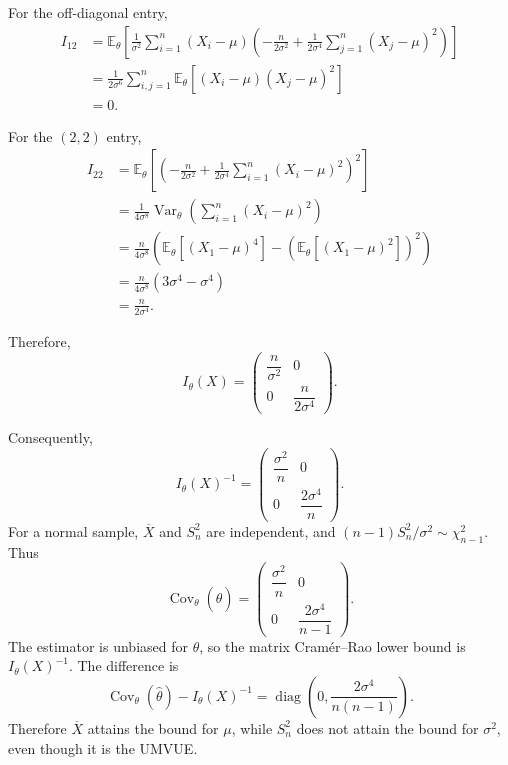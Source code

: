 \documentclass[lang=en,11pt,a4paper,citestyle=authoryear,nobib=true]{elegantpaper}
\begin{document}
For the off-diagonal entry,
\begin{align*}
I_{12}
&=
\mathbb E_\theta
\left[
\frac{1}{\sigma^2}
\sum_{i=1}^n(X_i-\mu)
\left(
-\frac{n}{2\sigma^2}
+
\frac{1}{2\sigma^4}
\sum_{j=1}^n(X_j-\mu)^2
\right)
\right]
\\
&=
\frac{1}{2\sigma^6}
\sum_{i,j=1}^n
\mathbb E_\theta
\left[
(X_i-\mu)(X_j-\mu)^2
\right]
\\
&=0.
\end{align*}

For the $(2,2)$ entry,
\begin{align*}
I_{22}
&=
\mathbb E_\theta
\left[
\left(
-\frac{n}{2\sigma^2}
+
\frac{1}{2\sigma^4}
\sum_{i=1}^n(X_i-\mu)^2
\right)^2
\right]
\\
&=
\frac{1}{4\sigma^8}
\operatorname{Var}_\theta
\left(
\sum_{i=1}^n(X_i-\mu)^2
\right)
\\
&=
\frac{n}{4\sigma^8}
\left(
\mathbb E_\theta[(X_1-\mu)^4]
-
\left(\mathbb E_\theta[(X_1-\mu)^2]\right)^2
\right)
\\
&=
\frac{n}{4\sigma^8}
(3\sigma^4-\sigma^4)
\\
&=
\frac{n}{2\sigma^4}.
\end{align*}

Therefore,
\[
I_\theta(X)
=
\begin{pmatrix}
\dfrac{n}{\sigma^2} & 0
\\[10pt]
0 & \dfrac{n}{2\sigma^4}
\end{pmatrix}.
\]

Consequently,
\[
{
I_\theta(X)^{-1}
=
\begin{pmatrix}
\dfrac{\sigma^2}{n} & 0
\\[10pt]
0 & \dfrac{2\sigma^4}{n}
\end{pmatrix}.
}
\]
For a normal sample, \(\overline X\) and \(S_n^2\) are independent,
and \((n-1)S_n^2/\sigma^2\sim\chi^2_{n-1}\). Thus
\[
\operatorname{Cov}_\theta(\widehat\theta)
=
\begin{pmatrix}
\dfrac{\sigma^2}{n} & 0\\[6pt]
0 & \dfrac{2\sigma^4}{n-1}
\end{pmatrix}.
\]
The estimator is unbiased for \(\theta\), so the matrix Cram\'er--Rao
lower bound is \(I_\theta(X)^{-1}\). The difference is
\[
\operatorname{Cov}_\theta(\widehat\theta)-I_\theta(X)^{-1}
=\operatorname{diag}\left(0,\frac{2\sigma^4}{n(n-1)}\right).
\]
Therefore \(\overline X\) attains the bound for \(\mu\), while \(S_n^2\)
does not attain the bound for \(\sigma^2\), even though it is the UMVUE.
\vspace{3em}
\end{document}
